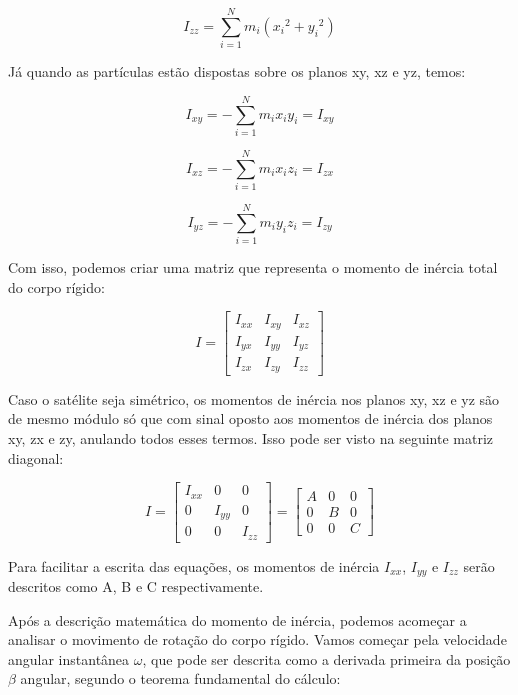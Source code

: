 \begin{equation}
  I_{zz}=\sum_{i=1}^{N}{m_i({x_i}^{2}+{y_i}^{2})}
\end{equation}

Já quando as partículas estão dispostas sobre os planos xy, xz e yz, temos:

\begin{equation}
  I_{xy}=-\sum_{i=1}^{N}{m_ix_iy_i}=I_{xy}
\end{equation}

\begin{equation}
  I_{xz}=-\sum_{i=1}^{N}{m_ix_iz_i}=I_{zx}
\end{equation}

\begin{equation}
  I_{yz}=-\sum_{i=1}^{N}{m_iy_iz_i}=I_{zy}
\end{equation}

Com isso, podemos criar uma matriz que representa o momento de inércia total do corpo rígido:

\begin{equation}\label{eq:nsimetrico}
I=\begin{bmatrix}I_{xx}&I_{xy}&I_{xz}\\I_{yx}&I_{yy}&I_{yz}\\I_{zx}&I_{zy}&I_{zz}\end{bmatrix}
\end{equation}

Caso o satélite seja simétrico, os momentos de inércia nos planos xy, xz e yz são de mesmo módulo só que com sinal oposto aos momentos de inércia dos planos xy, zx e zy, anulando todos esses termos. Isso pode ser visto na seguinte matriz diagonal:

\begin{equation}
I=\begin{bmatrix} I_{ xx } & 0 & 0 \\ 0 & I_{ yy } & 0 \\ 0 & 0 & I_{ zz } \end{bmatrix}=\begin{bmatrix} A & 0 & 0 \\ 0 & B & 0 \\ 0 & 0 & C \end{bmatrix}
\end{equation}

Para facilitar a escrita das equações, os momentos de inércia $I_{xx}$, $I_{yy}$ e $I_{zz}$ serão descritos como A, B e C respectivamente.

Após a descrição matemática do momento de inércia, podemos acomeçar a analisar o movimento de rotação do corpo rígido. Vamos começar pela velocidade angular instantânea $\omega$, que pode ser descrita como a derivada primeira da posição $\beta$ angular, segundo o teorema fundamental do cálculo:

